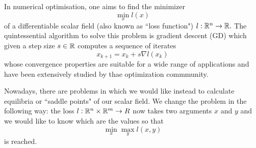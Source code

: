 \documentclass[main.tex]{subfiles}
\begin{document}
In numerical optimisation, one aims to find the minimizer \[\min_x l(x)\] of a
differentiable scalar field (also known as ``loss function") $l: \mathbb{R}^n \to \mathbb{R}.$
The quintessential algorithm to solve this problem is gradient descent (GD)
which given a step size $s \in \mathbb{R}$ computes a sequence of iterates \[x_{k+1} = x_k + s \nabla l(x_k)\] whose
convergence properties are suitable for a wide range of applications and have been
extensively studied by thae optimization commmunity.

Nowadays, there are problems in which we would like instead to calculate
equilibria or ``saddle points" of our scalar field. We change the problem in
the following way: the loss $l: \mathbb{R}^n \times \mathbb{R}^m \to R$ now takes two arguments
$x$ and $y$ and we would like to know which are the values so that \[\min_x
	\max_y l(x,y)\] is reached.
\end{document}

